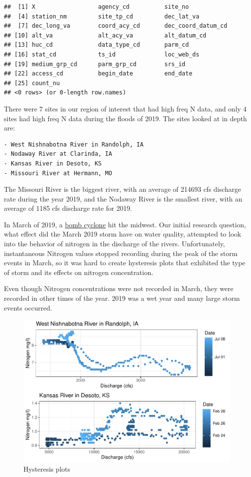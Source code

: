 \documentclass[12pt,]{article}
\begin{document}
\begin{verbatim}
##  [1] X                  agency_cd          site_no           
##  [4] station_nm         site_tp_cd         dec_lat_va        
##  [7] dec_long_va        coord_acy_cd       dec_coord_datum_cd
## [10] alt_va             alt_acy_va         alt_datum_cd      
## [13] huc_cd             data_type_cd       parm_cd           
## [16] stat_cd            ts_id              loc_web_ds        
## [19] medium_grp_cd      parm_grp_cd        srs_id            
## [22] access_cd          begin_date         end_date          
## [25] count_nu          
## <0 rows> (or 0-length row.names)
\end{verbatim}

There were 7 sites in our region of interest that had high freq N data,
and only 4 sites had high freq N data during the floods of 2019. The
sites looked at in depth are:

\begin{verbatim}
- West Nishnabotna River in Randolph, IA
- Nodaway River at Clarinda, IA
- Kansas River in Desoto, KS
- Missouri River at Hermann, MO
\end{verbatim}

The Missouri River is the biggest river, with an average of 214693 cfs
discharge rate during the year 2019, and the Nodaway River is the
smallest river, with an average of 1185 cfs discharge rate for 2019.

In March of 2019, a
\href{https://www.kansascity.com/news/state/missouri/article228237519.html}{bomb
cyclone} hit the midwest. Our initial research question, what effect did
the March 2019 storm have on water quality, attempted to look into the
behavior of nitrogen in the discharge of the rivers. Unfortunately,
instantaneous Nitrogen values stopped recording during the peak of the
storm events in March, so it was hard to create hysteresis plots that
exhibited the type of storm and its effects on nitrogen concentration.

Even though Nitrogen concentrations were not recorded in March, they
were recorded in other times of the year. 2019 was a wet year and many
large storm events occurred.

\begin{figure}
\centering
\includegraphics{Project_Template_files/figure-latex/desotos-1.pdf}
\caption{\label{fig:desotos} Hysteresis plots}
\end{figure}
\end{document}
